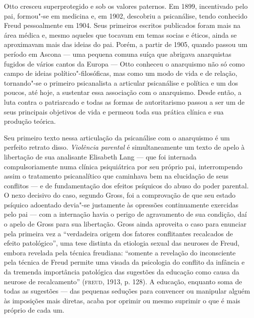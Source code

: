 Otto cresceu superprotegido e sob os valores paternos. Em 1899,
incentivado pelo pai, formou"-se em medicina e, em 1902, descobriu a
psicanálise, tendo conhecido Freud pessoalmente em 1904. Seus primeiros
escritos publicados foram mais na área médica e, mesmo aqueles que
tocavam em temas socias e éticos, ainda se aproximavam mais das ideias
do pai. Porém, a partir de 1905, quando passou um período em Ascona ---
uma pequena comuna suíça que abrigava anarquistas fugidos de vários
cantos da Europa --- Otto conheceu o anarquismo não só como campo de
ideias político"-filosóficas, mas como um modo de vida e de relação,
tornando"-se o primeiro psicanalista a articular psicanálise e política e
um dos poucos, até hoje, a sustentar essa associação com o anarquismo.
Desde então, a luta contra o patriarcado e todas as formas de
autoritarismo passou a ser um de seus principais objetivos de vida e
permeou toda sua prática clínica e sua produção teórica.

Seu primeiro texto nessa articulação da psicanálise com o anarquismo é
um perfeito retrato disso. \emph{Violência parental} é simultaneamente
um texto de apelo à libertação de sua analisante Elisabeth Lang --- que
foi internada compulsoriamente numa clínica psiquiátrica por seu próprio
pai, interrompendo assim o tratamento psicanalítico que caminhava bem na
elucidação de seus conflitos --- e de fundamentação dos efeitos psíquicos
do abuso do poder parental. O nexo decisivo do caso, segundo Gross, foi
a comprovação de que seu estado psíquico adoentado devia"-se justamente
às opressões continuamente exercidas pelo pai --- com a internação havia
o perigo de agravamento de sua condição, daí o apelo de Gross para sua
libertação. Gross ainda aproveita o caso para enunciar pela primeira vez
a ``verdadeira origem dos fatores conflitantes recalcados de efeito
patológico'', uma tese distinta da etiologia sexual das neuroses de
Freud, embora revelada pela técnica freudiana: ``somente a revelação do
inconsciente pela técnica de Freud permite uma visada da psicologia do
conflito da infância e da tremenda importância patológica das sugestões
da educação como causa da neurose de recalcamento'' (\textsc{freud}, 1913, p. 128). A
educação, enquanto soma de todas as sugestões --- das pequenas seduções
para convencer ou manipular alguém às imposições mais diretas, acaba por
oprimir ou mesmo suprimir o que é mais próprio de cada um.

